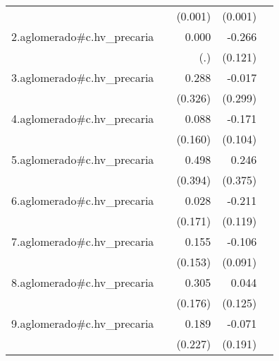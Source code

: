 {\begin{longtable}{l*{4}{D{.}{.}{-1}}}
            &                     &     (0.001)         &     (0.001)         &                     \\
\addlinespace
2.aglomerado#c.hv\_precaria&                     &       0.000         &      -0.266\sym{*}  &                     \\
            &                     &         (.)         &     (0.121)         &                     \\
\addlinespace
3.aglomerado#c.hv\_precaria&                     &       0.288         &      -0.017         &                     \\
            &                     &     (0.326)         &     (0.299)         &                     \\
\addlinespace
4.aglomerado#c.hv\_precaria&                     &       0.088         &      -0.171         &                     \\
            &                     &     (0.160)         &     (0.104)         &                     \\
\addlinespace
5.aglomerado#c.hv\_precaria&                     &       0.498         &       0.246         &                     \\
            &                     &     (0.394)         &     (0.375)         &                     \\
\addlinespace
6.aglomerado#c.hv\_precaria&                     &       0.028         &      -0.211         &                     \\
            &                     &     (0.171)         &     (0.119)         &                     \\
\addlinespace
7.aglomerado#c.hv\_precaria&                     &       0.155         &      -0.106         &                     \\
            &                     &     (0.153)         &     (0.091)         &                     \\
\addlinespace
8.aglomerado#c.hv\_precaria&                     &       0.305         &       0.044         &                     \\
            &                     &     (0.176)         &     (0.125)         &                     \\
\addlinespace
9.aglomerado#c.hv\_precaria&                     &       0.189         &      -0.071         &                     \\
            &                     &     (0.227)         &     (0.191)         &                     \\

\end{longtable}}
